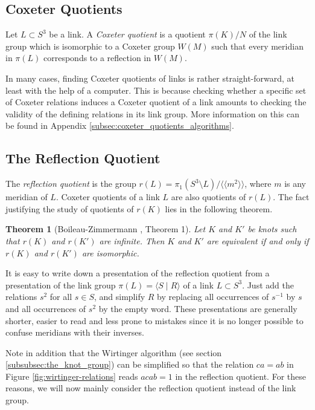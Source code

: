 \documentclass[a4paper]{article}
\newtheorem{theorem}{Theorem}[section]
\theoremstyle{definition}
\begin{document}
\subsection{Coxeter Quotients}
Let $L \subset S^3$ be a link. A \textit{Coxeter quotient} is a quotient $\pi(K)/N$ of the link group which is isomorphic to a Coxeter group $W(M)$ such that every meridian in $\pi(L)$ corresponds to a reflection in $W(M)$.

In many cases, finding Coxeter quotients of links is rather straight-forward, at least with the help of a computer. This is because checking whether a specific set of Coxeter relations induces a Coxeter quotient of a link amounts to checking the validity of the defining relations in its link group. More information on this can be found in Appendix \ref{subsec:coxeter_quotients_algorithms}.


\subsection{The Reflection Quotient}\label{subsec:reflection-quotient}
The \textit{reflection quotient} is the group $r(L) = \pi_1(S^3 \setminus L) / \langle \langle m^2 \rangle \rangle$, where $m$ is any meridian of $L$. Coxeter quotients of a link $L$ are also quotients of $r(L)$. The fact justifying the study of quotients of $r(K)$ lies in the following theorem.

\begin{theorem}[Boileau-Zimmermann \cite{boileau1989}, Theorem 1]
Let $K$ and $K'$ be knots such that $r(K)$ and $r(K')$ are infinite. Then $K$ and $K'$ are equivalent if and only if $r(K)$ and $r(K')$ are isomorphic.
\end{theorem}

It is easy to write down a presentation of the reflection quotient from a presentation of the link group $\pi(L) = \langle S \; | \; R \rangle$ of a link $L \subset S^3$. Just add the relations $s^2$ for all $s \in S$, and simplify $R$ by replacing all occurrences of $s^{-1}$ by $s$ and all occurrences of $s^2$ by the empty word. These presentations are generally shorter, easier to read and less prone to mistakes since it is no longer possible to confuse meridians with their inverses.

Note in addition that the Wirtinger algorithm (see section \ref{subsubsec:the_knot_group}) can be simplified so that the relation $ca = ab$ in Figure \ref{fig:wirtinger-relations} reads $acab = 1$ in the reflection quotient.
For these reasons, we will now mainly consider the reflection quotient instead of the link group.
\end{document}
